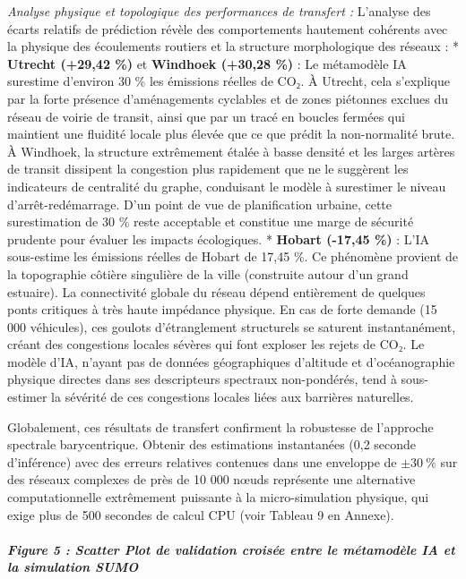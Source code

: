 \documentclass[10pt, a4paper]{article}
\begin{document}
\emph{Analyse physique et topologique des performances de transfert :}
L'analyse des écarts relatifs de prédiction révèle des comportements
hautement cohérents avec la physique des écoulements routiers et la
structure morphologique des réseaux : * \textbf{Utrecht (+29,42 \%)} et
\textbf{Windhoek (+30,28 \%)} : Le métamodèle IA surestime d'environ 30
\% les émissions réelles de CO₂. À Utrecht, cela s'explique par la forte
présence d'aménagements cyclables et de zones piétonnes exclues du
réseau de voirie de transit, ainsi que par un tracé en boucles fermées
qui maintient une fluidité locale plus élevée que ce que prédit la
non-normalité brute. À Windhoek, la structure extrêmement étalée à basse
densité et les larges artères de transit dissipent la congestion plus
rapidement que ne le suggèrent les indicateurs de centralité du graphe,
conduisant le modèle à surestimer le niveau d'arrêt-redémarrage. D'un
point de vue de planification urbaine, cette surestimation de 30 \%
reste acceptable et constitue une marge de sécurité prudente pour
évaluer les impacts écologiques. * \textbf{Hobart (-17,45 \%)} : L'IA
sous-estime les émissions réelles de Hobart de 17,45 \%. Ce phénomène
provient de la topographie côtière singulière de la ville (construite
autour d'un grand estuaire). La connectivité globale du réseau dépend
entièrement de quelques ponts critiques à très haute impédance physique.
En cas de forte demande (15 000 véhicules), ces goulots d'étranglement
structurels se saturent instantanément, créant des congestions locales
sévères qui font exploser les rejets de CO₂. Le modèle d'IA, n'ayant pas
de données géographiques d'altitude et d'océanographie physique directes
dans ses descripteurs spectraux non-pondérés, tend à sous-estimer la
sévérité de ces congestions locales liées aux barrières naturelles.

Globalement, ces résultats de transfert confirment la robustesse de
l'approche spectrale barycentrique. Obtenir des estimations instantanées
(0,2 seconde d'inférence) avec des erreurs relatives contenues dans une
enveloppe de \(\pm 30\ \%\) sur des réseaux complexes de près de 10 000
nœuds représente une alternative computationnelle extrêmement puissante
à la micro-simulation physique, qui exige plus de 500 secondes de calcul
CPU (voir Tableau 9 en Annexe).

\subparagraph{Figure 5 : Scatter Plot de validation croisée entre le
métamodèle IA et la simulation
SUMO}\label{figure-5-scatter-plot-de-validation-croisuxe9e-entre-le-muxe9tamoduxe8le-ia-et-la-simulation-sumo}
\end{document}
